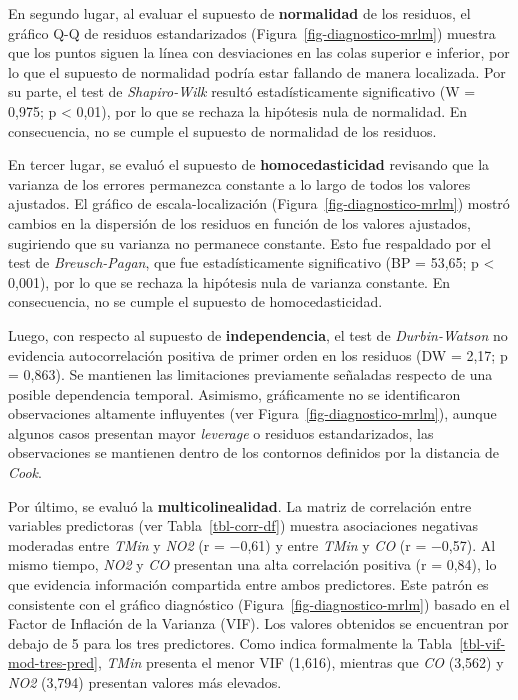 \documentclass[
  spanish,
  letterpaper,
  DIV=11,
  numbers=noendperiod]{scrartcl}
\begin{document}
En segundo lugar, al evaluar el supuesto de \textbf{normalidad} de los
residuos, el gráfico Q-Q de residuos estandarizados
(Figura~\ref{fig-diagnostico-mrlm}) muestra que los puntos siguen la
línea con desviaciones en las colas superior e inferior, por lo que el
supuesto de normalidad podría estar fallando de manera localizada. Por
su parte, el test de \emph{Shapiro-Wilk} resultó estadísticamente
significativo (W = 0,975; p \textless{} 0,01), por lo que se rechaza la
hipótesis nula de normalidad. En consecuencia, no se cumple el supuesto
de normalidad de los residuos.

En tercer lugar, se evaluó el supuesto de \textbf{homocedasticidad}
revisando que la varianza de los errores permanezca constante a lo largo
de todos los valores ajustados. El gráfico de escala-localización
(Figura~\ref{fig-diagnostico-mrlm}) mostró cambios en la dispersión de
los residuos en función de los valores ajustados, sugiriendo que su
varianza no permanece constante. Esto fue respaldado por el test de
\emph{Breusch-Pagan}, que fue estadísticamente significativo (BP =
53,65; p \textless{} 0,001), por lo que se rechaza la hipótesis nula de
varianza constante. En consecuencia, no se cumple el supuesto de
homocedasticidad.

Luego, con respecto al supuesto de \textbf{independencia}, el test de
\emph{Durbin-Watson} no evidencia autocorrelación positiva de primer
orden en los residuos (DW = 2,17; p = 0,863). Se mantienen las
limitaciones previamente señaladas respecto de una posible dependencia
temporal. Asimismo, gráficamente no se identificaron observaciones
altamente influyentes (ver Figura~\ref{fig-diagnostico-mrlm}), aunque
algunos casos presentan mayor \emph{leverage} o residuos estandarizados,
las observaciones se mantienen dentro de los contornos definidos por la
distancia de \emph{Cook}.

Por último, se evaluó la \textbf{multicolinealidad}. La matriz de
correlación entre variables predictoras (ver Tabla~\ref{tbl-corr-df})
muestra asociaciones negativas moderadas entre \emph{TMin} y \emph{NO2}
(r = −0,61) y entre \emph{TMin} y \emph{CO} (r = −0,57). Al mismo
tiempo, \emph{NO2} y \emph{CO} presentan una alta correlación positiva
(r = 0,84), lo que evidencia información compartida entre ambos
predictores. Este patrón es consistente con el gráfico diagnóstico
(Figura~\ref{fig-diagnostico-mrlm}) basado en el Factor de Inflación de
la Varianza (VIF). Los valores obtenidos se encuentran por debajo de 5
para los tres predictores. Como indica formalmente la
Tabla~\ref{tbl-vif-mod-tres-pred}, \emph{TMin} presenta el menor VIF
(1,616), mientras que \emph{CO} (3,562) y \emph{NO2} (3,794) presentan
valores más elevados.
\end{document}
